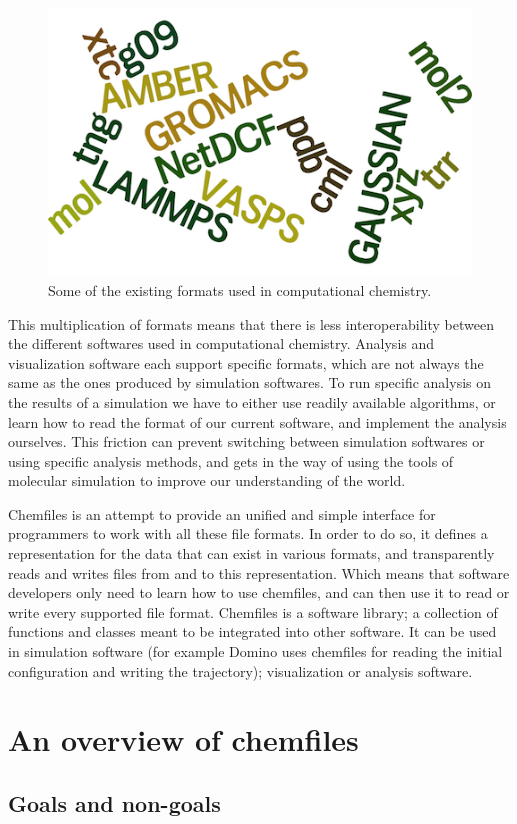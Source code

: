 \documentclass[thesis]{subfiles}
\begin{document}
\begin{figure}[ht]
    \centering
    \includegraphics[width=.4\textwidth]{figures/images/files-formats}
    \caption{Some of the existing formats used in computational chemistry.}
    \label{fig:chemfiles:formats}
\end{figure}

This multiplication of formats means that there is less interoperability between
the different softwares used in computational chemistry. Analysis and
visualization software each support specific formats, which are not always the
same as the ones produced by simulation softwares. To run specific analysis on
the results of a simulation we have to either use readily available algorithms,
or learn how to read the format of our current software, and implement the
analysis ourselves. This friction can prevent switching between simulation
softwares or using specific analysis methods, and gets in the way of using the
tools of molecular simulation to improve our understanding of the world.

Chemfiles is an attempt to provide an unified and simple interface for
programmers to work with all these file formats. In order to do so, it defines a
representation for the data that can exist in various formats, and transparently
reads and writes files from and to this representation. Which means that
software developers only need to learn how to use chemfiles, and can then use it
to read or write every supported file format. Chemfiles is a software library; a
collection of functions and classes meant to be integrated into other software.
It can be used in simulation software (for example Domino uses chemfiles for
reading the initial configuration and writing the trajectory); visualization or
analysis software.

\newpage
\section{An overview of chemfiles}

\subsection{Goals and non-goals}
\end{document}
